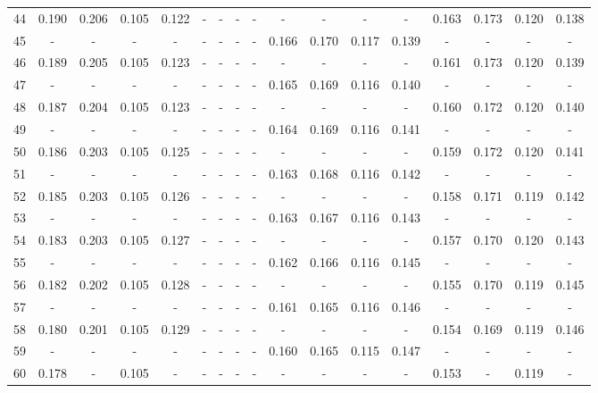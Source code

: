 \documentclass{report}
\begin{document}
\begin{appendices}
\begin{table}
\begin{tabular}{|c|cccc|cccc|cccc|cccc|}
44 & 0.190 & 0.206 & 0.105 & 0.122 &   -   &   -   &   -   &   -   &   -   &   -   &   -   &   -   & 0.163 & 0.173 & 0.120 & 0.138\\
45 &   -   &   -   &   -   &   -   &   -   &   -   &   -   &   -   & 0.166 & 0.170 & 0.117 & 0.139 &   -   &   -   &   -   &   -  \\
46 & 0.189 & 0.205 & 0.105 & 0.123 &   -   &   -   &   -   &   -   &   -   &   -   &   -   &   -   & 0.161 & 0.173 & 0.120 & 0.139\\
47 &   -   &   -   &   -   &   -   &   -   &   -   &   -   &   -   & 0.165 & 0.169 & 0.116 & 0.140 &   -   &   -   &   -   &   -  \\
48 & 0.187 & 0.204 & 0.105 & 0.123 &   -   &   -   &   -   &   -   &   -   &   -   &   -   &   -   & 0.160 & 0.172 & 0.120 & 0.140\\
49 &   -   &   -   &   -   &   -   &   -   &   -   &   -   &   -   & 0.164 & 0.169 & 0.116 & 0.141 &   -   &   -   &   -   &   -  \\
50 & 0.186 & 0.203 & 0.105 & 0.125 &   -   &   -   &   -   &   -   &   -   &   -   &   -   &   -   & 0.159 & 0.172 & 0.120 & 0.141\\
51 &   -   &   -   &   -   &   -   &   -   &   -   &   -   &   -   & 0.163 & 0.168 & 0.116 & 0.142 &   -   &   -   &   -   &   -  \\
52 & 0.185 & 0.203 & 0.105 & 0.126 &   -   &   -   &   -   &   -   &   -   &   -   &   -   &   -   & 0.158 & 0.171 & 0.119 & 0.142\\
53 &   -   &   -   &   -   &   -   &   -   &   -   &   -   &   -   & 0.163 & 0.167 & 0.116 & 0.143 &   -   &   -   &   -   &   -  \\
54 & 0.183 & 0.203 & 0.105 & 0.127 &   -   &   -   &   -   &   -   &   -   &   -   &   -   &   -   & 0.157 & 0.170 & 0.120 & 0.143\\
55 &   -   &   -   &   -   &   -   &   -   &   -   &   -   &   -   & 0.162 & 0.166 & 0.116 & 0.145 &   -   &   -   &   -   &   -  \\
56 & 0.182 & 0.202 & 0.105 & 0.128 &   -   &   -   &   -   &   -   &   -   &   -   &   -   &   -   & 0.155 & 0.170 & 0.119 & 0.145\\
57 &   -   &   -   &   -   &   -   &   -   &   -   &   -   &   -   & 0.161 & 0.165 & 0.116 & 0.146 &   -   &   -   &   -   &   -  \\
58 & 0.180 & 0.201 & 0.105 & 0.129 &   -   &   -   &   -   &   -   &   -   &   -   &   -   &   -   & 0.154 & 0.169 & 0.119 & 0.146\\
59 &   -   &   -   &   -   &   -   &   -   &   -   &   -   &   -   & 0.160 & 0.165 & 0.115 & 0.147 &   -   &   -   &   -   &   -  \\
60 & 0.178 &   -   & 0.105 &   -   &   -   &   -   &   -   &   -   &   -   &   -   &   -   &   -   & 0.153 &   -   & 0.119 &   -  \\
\hline
\end{tabular}
\end{table}


\end{appendices}
\end{document}
